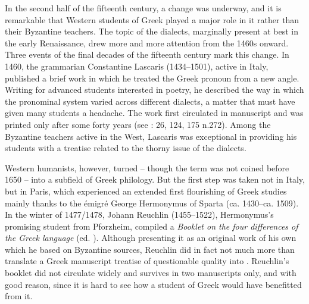 In the second half of the fifteenth century, a change was underway, and it is remarkable that Western students of Greek played a major role in it rather than their Byzantine teachers. The topic of the dialects, marginally present at best in the early Renaissance, drew more and more attention from the 1460s onward. Three events of the final decades of the fifteenth century mark this change. In 1460, the  grammarian Constantine Lascaris (1434–1501), active in Italy, published a brief work in which he treated the Greek pronoun from a new angle. Writing for advanced students interested in poetry, he described the way in which the pronominal system varied across different dialects, a matter that must have given many students a headache. The work first circulated in manuscript and was printed only after some forty years (see \citealt{Botley2010}: 26, 124, 175 n.272). Among the Byzantine teachers active in the West, Lascaris was exceptional in providing his students with a treatise related to the thorny issue of the dialects.

Western humanists, however, turned  – though the term was not coined before 1650 – into a subfield of Greek philology. But the first step was taken not in Italy, but in Paris, which experienced an extended first flourishing of Greek studies mainly thanks to the émigré George Hermonymus of Sparta (ca. 1430–ca. 1509). In the winter of 1477/1478, Johann Reuchlin (1455–1522), Hermonymus’s promising student from Pforzheim, compiled a \textit{Booklet on the four differences of the Greek language} (ed. \citealt{VanRooy2014}). Although presenting it as an original work of his own which he based on Byzantine sources, Reuchlin did in fact not much more than translate a Greek manuscript treatise of questionable quality into . Reuchlin’s booklet did not circulate widely and survives in two manuscripts only, and with good reason, since it is hard to see how a student of Greek would have benefitted from it.

